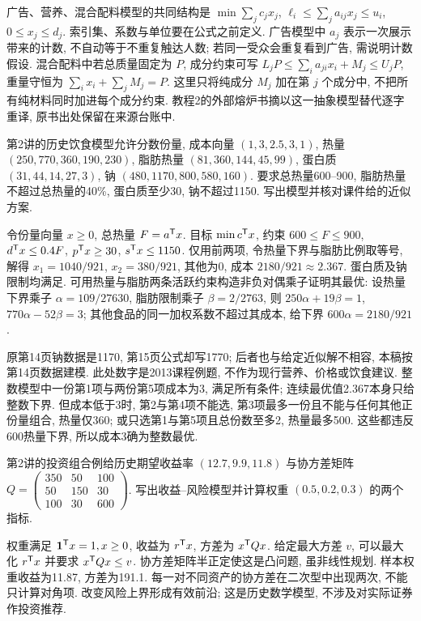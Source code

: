 广告、营养、混合配料模型的共同结构是 $\min\sum_jc_jx_j$, $\ell_i\le\sum_ja_{ij}x_j\le u_i$, $0\le x_j\le d_j$. 索引集、系数与单位要在公式之前定义. 广告模型中 $a_j$ 表示一次展示带来的计数, 不自动等于不重复触达人数; 若同一受众会重复看到广告, 需说明计数假设. 混合配料中若总质量固定为 $P$, 成分约束可写 $L_jP\le\sum_i a_{ji}x_i+M_j\le U_jP$, 重量守恒为 $\sum_i x_i+\sum_jM_j=P$. 这里只将纯成分 $M_j$ 加在第 $j$ 个成分中, 不把所有纯材料同时加进每个成分约束. 教程2的外部熔炉书摘以这一抽象模型替代逐字重译, 原书出处保留在来源台账中.

\begin{example}
第2讲的历史饮食模型允许分数份量, 成本向量 $(1,3,2.5,3,1)$, 热量 $(250,770,360,190,230)$, 脂肪热量 $(81,360,144,45,99)$, 蛋白质 $(31,44,14,27,3)$, 钠 $(480,1170,800,580,160)$. 要求总热量600--900, 脂肪热量不超过总热量的40\%, 蛋白质至少30, 钠不超过1150. 写出模型并核对课件给的近似方案.
\end{example}
\begin{solution}
令份量向量 $x\ge0$, 总热量 $F=a^{\mathsf T} x$. 目标 $\min c^{\mathsf T} x$, 约束 $600\le F\le900$, $d^{\mathsf T} x\le0.4F$, $p^{\mathsf T} x\ge30$, $s^{\mathsf T} x\le1150$. 仅用前两项, 令热量下界与脂肪比例取等号, 解得 $x_1=1040/921$, $x_2=380/921$, 其他为0, 成本 $2180/921\approx2.367$. 蛋白质及钠限制均满足. 可用热量与脂肪两条活跃约束构造非负对偶乘子证明其最优: 设热量下界乘子 $\alpha=109/27630$, 脂肪限制乘子 $\beta=2/2763$, 则 $250\alpha+19\beta=1$, $770\alpha-52\beta=3$; 其他食品的同一加权系数不超过其成本, 给下界 $600\alpha=2180/921$.

原第14页钠数据是1170, 第15页公式却写1770; 后者也与给定近似解不相容, 本稿按第14页数据建模. 此处数字是2013课程例题, 不作为现行营养、价格或饮食建议. 整数模型中一份第1项与两份第5项成本为3, 满足所有条件; 连续最优值2.367本身只给整数下界. 但成本低于3时, 第2与第4项不能选, 第3项最多一份且不能与任何其他正份量组合, 热量仅360; 或只选第1与第5项且总份数至多2, 热量最多500. 这些都违反600热量下界, 所以成本3确为整数最优.
\end{solution}

\begin{example}
第2讲的投资组合例给历史期望收益率 $(12.7,9.9,11.8)$ 与协方差矩阵
$Q=\left(\begin{smallmatrix}350&50&100\\50&150&30\\100&30&600\end{smallmatrix}\right)$. 写出收益--风险模型并计算权重 $(0.5,0.2,0.3)$ 的两个指标.
\end{example}
\begin{solution}
权重满足 $\mathbf1^{\mathsf T} x=1,x\ge0$, 收益为 $r^{\mathsf T} x$, 方差为 $x^{\mathsf T} Qx$. 给定最大方差 $v$, 可以最大化 $r^{\mathsf T} x$ 并要求 $x^{\mathsf T} Qx\le v$. 协方差矩阵半正定使这是凸问题, 虽非线性规划. 样本权重收益为11.87, 方差为191.1. 每一对不同资产的协方差在二次型中出现两次, 不能只计算对角项. 改变风险上界形成有效前沿; 这是历史数学模型, 不涉及对实际证券作投资推荐.
\end{solution}

